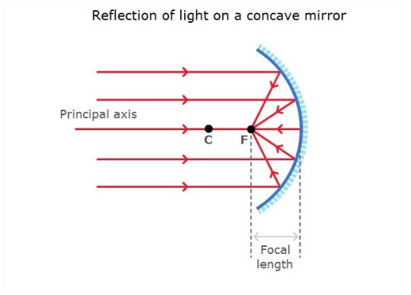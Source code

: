 \documentclass{beamer}
\begin{document}
\begin{frame}
	\begin{center}
		\includegraphics[scale=0.5]{44.jpeg}
	\end{center}
\end{frame}
\end{document}
